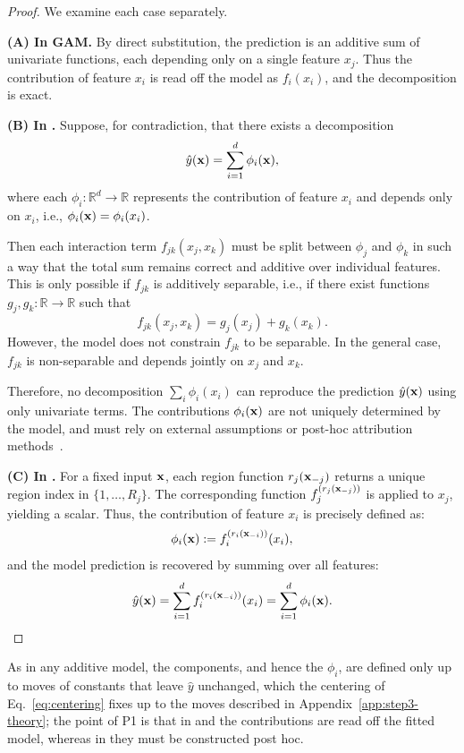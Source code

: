 \begin{proof}
We examine each case separately.

\textbf{(A) In GAM.} By direct substitution, the prediction is an additive sum of univariate functions, each depending only on a single feature \( x_j \). Thus the contribution of feature \( x_i \) is read off the model as \( f_i(x_i) \), and the decomposition is exact. 

\textbf{(B) In \gamm.} Suppose, for contradiction, that there exists a decomposition
\[
\hat{y}(\mathbf{x}) = \sum_{i=1}^d \phi_i(\mathbf{x}),
\]
where each \( \phi_i : \mathbb{R}^d \to \mathbb{R} \) represents the contribution of feature \( x_i \) and depends only on \( x_i \), i.e., \( \phi_i(\mathbf{x}) = \phi_i(x_i) \).

Then each interaction term \( f_{jk}(x_j, x_k) \) must be split between \( \phi_j \) and \( \phi_k \) in such a way that the total sum remains correct and additive over individual features. This is only possible if \( f_{jk} \) is additively separable, i.e., if there exist functions \( g_j, g_k : \mathbb{R} \to \mathbb{R} \) such that
\[
f_{jk}(x_j, x_k) = g_j(x_j) + g_k(x_k).
\]
However, the model does not constrain \( f_{jk} \) to be separable. In the general case, \( f_{jk} \) is non-separable and depends jointly on \( x_j \) and \( x_k \).

Therefore, no decomposition \( \sum_i \phi_i(x_i) \) can reproduce the prediction \( \hat{y}(\mathbf{x}) \) using only univariate terms. The contributions \( \phi_i(\mathbf{x}) \) are not uniquely determined by the model, and must rely on external assumptions or post-hoc attribution methods~\cite{gosiewska2019do}.

 \textbf{(C) In \method{}.} For a fixed input \( \mathbf{x} \), each region function \( r_j(\mathbf{x}_{-j}) \) returns a unique region index in \( \{1, \dots, R_j\} \). The corresponding function \( f_j^{(r_j(\mathbf{x}_{-j}))} \) is applied to \( x_j \), yielding a scalar. Thus, the contribution of feature \( x_i \) is precisely defined as:
\[
\phi_i(\mathbf{x}) := f_i^{(r_i(\mathbf{x}_{-i}))}(x_i),
\]
and the model prediction is recovered by summing over all features:
\[
\hat{y}(\mathbf{x}) = \sum_{i=1}^d f_i^{(r_i(\mathbf{x}_{-i}))}(x_i) = \sum_{i=1}^d \phi_i(\mathbf{x}). 
\]
\end{proof}
As in any additive model, the components, and hence the \( \phi_i \), are defined only up to moves of constants that leave \( \hat{y} \) unchanged, which the centering of Eq.~\eqref{eq:centering} fixes up to the moves described in Appendix~\ref{app:step3-theory}; the point of P1 is that in \gam{} and \method{} the contributions are read off the fitted model, whereas in \gamm{} they must be constructed post hoc.

